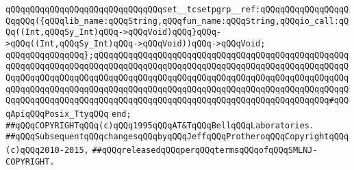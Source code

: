 \verb|qQQqqQQqqQQqqQQqqQQqqQQqqQQqqQQqset__tcsetpgrp__ref:qQQqqQQqqQQqqQQqqQQqqQQq({qQQqlib_name:qQQqString,qQQqfun_name:qQQqString,qQQqio_call:qQQq((Int,qQQqSy_Int)qQQq->qQQqVoid)qQQq}qQQq->qQQq((Int,qQQqSy_Int)qQQq->qQQqVoid))qQQq->qQQqVoid;|\newline
\verb|qQQqqQQqqQQqqQQq};qQQqqQQqqQQqqQQqqQQqqQQqqQQqqQQqqQQqqQQqqQQqqQQqqQQqqQQqqQQqqQQqqQQqqQQqqQQqqQQqqQQqqQQqqQQqqQQqqQQqqQQqqQQqqQQqqQQqqQQqqQQqqQQqqQQqqQQqqQQqqQQqqQQqqQQqqQQqqQQqqQQqqQQqqQQqqQQqqQQqqQQqqQQqqQQqqQQqqQQqqQQqqQQqqQQqqQQqqQQqqQQqqQQqqQQqqQQqqQQqqQQqqQQqqQQqqQQqqQQqqQQqqQQqqQQqqQQqqQQqqQQqqQQqqQQqqQQqqQQqqQQqqQQqqQQqqQQqqQQqqQQqqQQq#qQQqApiqQQqPosix_TtyqQQq|\newline
\verb|end;|\newline
\newline
\newline
\verb|##qQQqCOPYRIGHTqQQq(c)qQQq1995qQQqAT&TqQQqBellqQQqLaboratories.|\newline
\verb|##qQQqSubsequentqQQqchangesqQQqbyqQQqJeffqQQqProtheroqQQqCopyrightqQQq(c)qQQq2010-2015,|\newline
\verb|##qQQqreleasedqQQqperqQQqtermsqQQqofqQQqSMLNJ-COPYRIGHT.|\newline

